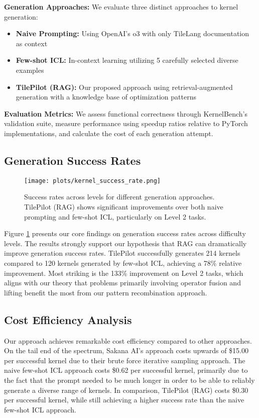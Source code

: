 \documentclass{article}
\begin{document}
\textbf{Generation Approaches:} We evaluate three distinct approaches to kernel generation:
\begin{itemize}
\item \textbf{Naive Prompting:} Using OpenAI's o3 with only TileLang documentation as context
\item \textbf{Few-shot ICL:} In-context learning utilizing 5 carefully selected diverse examples
\item \textbf{TilePilot (RAG):} Our proposed approach using retrieval-augmented generation with a knowledge base of optimization patterns
\end{itemize}

\textbf{Evaluation Metrics:} We assess functional correctness through KernelBench's validation suite, measure performance using speedup ratios relative to PyTorch implementations, and calculate the cost of each generation attempt.

\subsection{Generation Success Rates}

\begin{figure}[htbp]
    \centering
    \texttt{[image: plots/kernel\_success\_rate.png]}
    \caption{Success rates across levels for different generation approaches. TilePilot (RAG) shows significant improvements over both naive prompting and few-shot ICL, particularly on Level 2 tasks.}
    \label{fig:success_rates}
\end{figure}

Figure \ref{fig:success_rates} presents our core findings on generation success rates across difficulty levels. The results strongly support our hypothesis that RAG can dramatically improve generation success rates. TilePilot successfully generates 214 kernels compared to 120 kernels generated by few-shot ICL, achieving a 78\% relative improvement. Most striking is the 133\% improvement on Level 2 tasks, which aligns with our theory that problems primarily involving operator fusion and lifting benefit the most from our pattern recombination approach.

\subsection{Cost Efficiency Analysis}

Our approach achieves remarkable cost efficiency compared to other approaches. On the tail end of the spectrum, Sakana AI's approach \cite{sakana2024} costs upwards of \$15.00 per successful kernel due to their brute force iterative sampling approach. The naive few-shot ICL approach costs \$0.62 per successful kernel, primarily due to the fact that the prompt needed to be much longer in order to be able to reliably generate a diverse range of kernels. In comparison, TilePilot (RAG) costs \$0.30 per successful kernel, while still achieving a higher success rate than the naive few-shot ICL approach.
\end{document}
